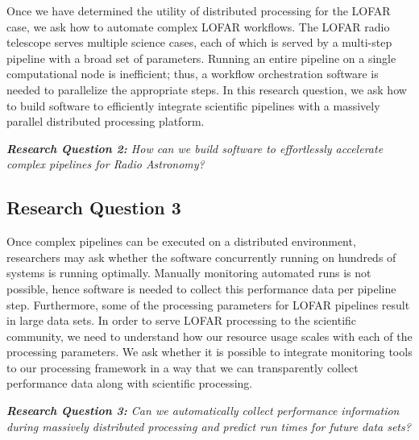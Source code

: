 Once we have determined the utility of distributed processing for the LOFAR case, we ask how to automate complex LOFAR workflows. The LOFAR radio telescope serves multiple science cases, each of which is served by a multi-step pipeline with a broad set of parameters. Running an entire pipeline on a single computational node is inefficient; thus, a workflow orchestration software is needed to parallelize the appropriate steps. In this research question, we ask how to build software to efficiently integrate scientific pipelines with a massively parallel distributed processing platform. 

\begin{addmargin}[4em]{8em}%
    \emph{\textbf{Research Question 2:} How can we build software to effortlessly accelerate complex pipelines for Radio Astronomy?} 
\end{addmargin}


\subsection{Research Question 3}

Once complex pipelines can be executed on a distributed environment, researchers may ask whether the software concurrently running on hundreds of systems is running optimally. Manually monitoring automated runs is not possible, hence software is needed to collect this performance data per pipeline step. Furthermore, some of the processing parameters for LOFAR pipelines result in large data sets. In order to serve LOFAR processing to the scientific community, we need to understand how our resource usage scales with each of the processing parameters. We ask whether it is possible to integrate monitoring tools to our processing framework in a way that we can transparently collect performance data along with scientific processing.     


\begin{addmargin}[4em]{8em}%
    \emph{\textbf{Research Question 3:} Can we automatically collect performance information during massively distributed processing and predict run times for future data sets?}
\end{addmargin}
